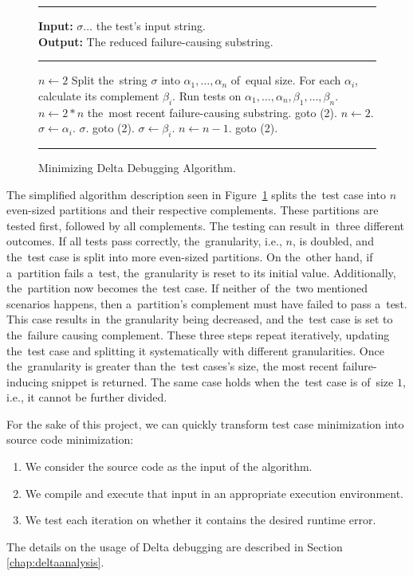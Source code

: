 \begin{figure}[h]
	\hrule height.8pt depth0pt \kern2pt
	\textbf{Input:} $\sigma \ldots$ the test's input string. \\
	\textbf{Output:} The reduced failure-causing substring. 
	\hrule height.8pt depth0pt \kern2pt
	\begin{algorithmic}[1]
		\State $n \leftarrow 2$
		\State Split the~string $\sigma$ into $\alpha_1,\dots,\alpha_n$ of~equal size.
		\State For each $\alpha_i$, calculate its complement $\beta_i$.
		\State Run tests on $\alpha_1,\dots,\alpha_n,\beta_1,\dots,\beta_n$.
			\State $n \leftarrow 2*n$
				\Return the~most recent failure-causing substring.
			\Else
				\State goto (2).
			\EndIf
			\State $n \leftarrow 2$.
			\State $\sigma \leftarrow \alpha_i$.
				\Return $\sigma$.
			\Else
				\State goto (2).
			\EndIf
		\Else
			\State $\sigma \leftarrow \beta_i$.
			\State $n \leftarrow n - 1$.
			\State goto (2).
		\EndIf
	\end{algorithmic} 
	\hrule height.8pt depth0pt \kern2pt
	\caption{Minimizing Delta Debugging Algorithm.} 
	\label{alg:dd}
\end{figure}

The simplified algorithm description seen in Figure~\ref{alg:dd} splits 
the~test case into $n$ even-sized partitions and their respective complements. 
These partitions are tested first, followed by all complements. 
The testing can result in~three different outcomes.
If all tests pass correctly, the~granularity, i.e., $n$, is doubled, and 
the~test case is split into more even-sized partitions. 
On the~other hand, if a~partition fails a~test, the~granularity is reset to 
its initial value.
Additionally, the~partition now becomes the~test case. 
If neither of~the~two mentioned scenarios happens, 
then a~partition's complement must have failed to pass a~test. 
This case results in~the granularity being decreased, 
and the~test case is set to the~failure causing complement.
These three steps repeat iteratively, updating the~test case and 
splitting it systematically with different granularities. 
Once the~granularity is greater than the~test cases's size, 
the most recent failure-inducing snippet is returned. 
The same case holds when the~test case is of~size $1$, i.e., it cannot be 
further divided.

For the sake of this project, we can quickly transform test case 
minimization into source code minimization:
\begin{enumerate}
  \item We consider the source code as the input of the algorithm.
  \item We compile and execute that input in an appropriate execution 
  environment.
  \item We test each iteration on whether it contains the desired runtime 
  error.
\end{enumerate}
The details on the usage of Delta debugging are described in Section~
\ref{chap:deltaanalysis}.

